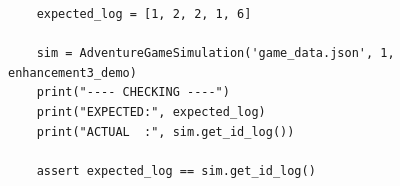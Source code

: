\documentclass[11pt]{article}
\begin{document}
\begin{enumerate}
\begin{itemize}
\begin{verbatim}
    expected_log = [1, 2, 2, 1, 6]

    sim = AdventureGameSimulation('game_data.json', 1, enhancement3_demo)
    print("---- CHECKING ----")
    print("EXPECTED:", expected_log)
    print("ACTUAL  :", sim.get_id_log())

    assert expected_log == sim.get_id_log()
        \end{verbatim}
    \end{itemize}

\end{enumerate}
\end{document}
